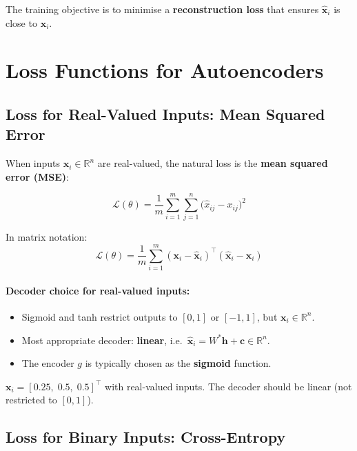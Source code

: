 \documentclass[12pt,a4paper]{article}
\newcommand{\R}{\mathbb{R}}
\newcommand{\vx}{\mathbf{x}}
\newcommand{\vh}{\mathbf{h}}
\newcommand{\vc}{\mathbf{c}}
\newcommand{\hatx}{\hat{\mathbf{x}}}
\newcommand{\Loss}{\mathcal{L}}
\begin{document}
The training objective is to minimise a \textbf{reconstruction loss} that ensures $\hatx_i$ is close to $\vx_i$.

\section{Loss Functions for Autoencoders}

\subsection{Loss for Real-Valued Inputs: Mean Squared Error}

When inputs $\vx_i \in \R^n$ are real-valued, the natural loss is the \textbf{mean squared error (MSE)}:

\[
  \Loss(\theta) = \frac{1}{m}\sum_{i=1}^{m}\sum_{j=1}^{n}
    \bigl(\hat{x}_{ij} - x_{ij}\bigr)^2
\]

In matrix notation:
\[
  \Loss(\theta) = \frac{1}{m}\sum_{i=1}^{m}
    (\vx_i - \hatx_i)^\top(\hatx_i - \vx_i)
\]

\paragraph{Decoder choice for real-valued inputs:}
\begin{itemize}
  \item Sigmoid and tanh restrict outputs to $[0,1]$ or $[-1,1]$, but $\vx_i \in \R^n$.
  \item Most appropriate decoder: \textbf{linear}, i.e.\ $\hatx_i = W^*\vh + \vc \in \R^n$.
  \item The encoder $g$ is typically chosen as the \textbf{sigmoid} function.
\end{itemize}

\begin{examplebox}
$\vx_i = [0.25,\; 0.5,\; 0.5]^\top$ with real-valued inputs. The decoder should be linear (not restricted to $[0,1]$).
\end{examplebox}

\subsection{Loss for Binary Inputs: Cross-Entropy}
\end{document}
